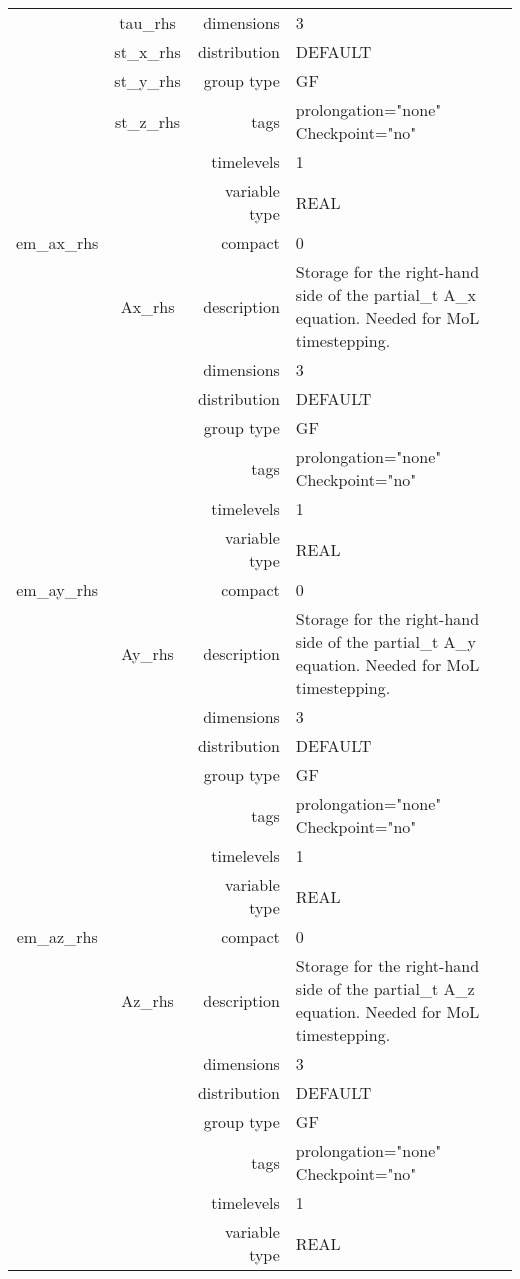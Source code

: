 \documentclass{article}
\begin{document}
\begin{tabular*}{150mm}{|c|c@{\extracolsep{\fill}}|rl|}
 & tau\_rhs & dimensions & 3 \\ 
 & st\_x\_rhs & distribution & DEFAULT \\ 
 & st\_y\_rhs & group type & GF \\ 
 & st\_z\_rhs & tags & prolongation="none" Checkpoint="no" \\ 
 &  & timelevels & 1 \\ 
 &  & variable type & REAL \\ 
\hline 
em\_ax\_rhs &  & compact & 0 \\ 
 & Ax\_rhs & description & Storage for the right-hand side of the partial\_t A\_x equation. Needed for MoL timestepping. \\ 
 &  & dimensions & 3 \\ 
 &  & distribution & DEFAULT \\ 
 &  & group type & GF \\ 
 &  & tags & prolongation="none" Checkpoint="no" \\ 
 &  & timelevels & 1 \\ 
 &  & variable type & REAL \\ 
\hline 
em\_ay\_rhs &  & compact & 0 \\ 
 & Ay\_rhs & description & Storage for the right-hand side of the partial\_t A\_y equation. Needed for MoL timestepping. \\ 
 &  & dimensions & 3 \\ 
 &  & distribution & DEFAULT \\ 
 &  & group type & GF \\ 
 &  & tags & prolongation="none" Checkpoint="no" \\ 
 &  & timelevels & 1 \\ 
 &  & variable type & REAL \\ 
\hline 
em\_az\_rhs &  & compact & 0 \\ 
 & Az\_rhs & description & Storage for the right-hand side of the partial\_t A\_z equation. Needed for MoL timestepping. \\ 
 &  & dimensions & 3 \\ 
 &  & distribution & DEFAULT \\ 
 &  & group type & GF \\ 
 &  & tags & prolongation="none" Checkpoint="no" \\ 
 &  & timelevels & 1 \\ 
 &  & variable type & REAL \\ 
\hline 
\end{tabular*} 
\end{document}

